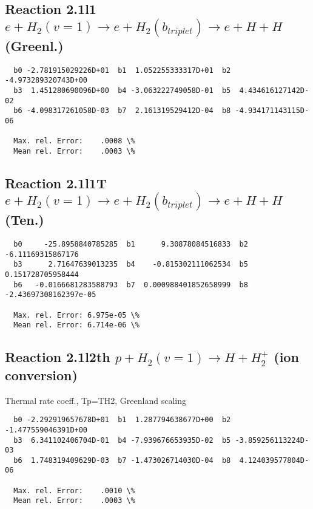 \documentclass[12pt,dvipdfmx]{article}
\begin{document}
\newpage
\subsection{
Reaction 2.1l1
$ e + H_2(v=1) \rightarrow e + H_2(b_{triplet})\rightarrow e + H + H $ (Greenl.)
}


\begin{small}\begin{verbatim}
  b0 -2.781915029226D+01  b1  1.052255333317D+01  b2 -4.973289320743D+00
  b3  1.451280690096D+00  b4 -3.063222749058D-01  b5  4.434616127142D-02
  b6 -4.098317261058D-03  b7  2.161319529412D-04  b8 -4.934171143115D-06

  Max. rel. Error:    .0008 \%
  Mean rel. Error:    .0003 \%

\end{verbatim}\end{small}


\subsection{
Reaction 2.1l1T
$ e +  H_2(v=1) \rightarrow e + H_2(b_{triplet})\rightarrow e + H + H $ (Ten.)
}

\begin{small}\begin{verbatim}
  b0     -25.8958840785285  b1      9.30878084516833  b2     -6.11169315867176
  b3      2.71647639013235  b4    -0.815302111062534  b5     0.151728705958444
  b6   -0.0166681283588793  b7  0.000988401852658999  b8 -2.43697308162397e-05

  Max. rel. Error: 6.975e-05 \%
  Mean rel. Error: 6.714e-06 \%
\end{verbatim}\end{small}




\subsection{
Reaction 2.1l2th
$ p + H_2(v=1) \rightarrow H + H_2^+$ (ion conversion)
}
Thermal rate coeff., Tp=TH2, Greenland scaling

\begin{small}\begin{verbatim}
  b0 -2.292919657678D+01  b1  1.287794638677D+00  b2 -1.477559046391D+00
  b3  6.341102406704D-01  b4 -7.939676653935D-02  b5 -3.859256113224D-03
  b6  1.748319409629D-03  b7 -1.473026714030D-04  b8  4.124039577804D-06

  Max. rel. Error:    .0010 \%
  Mean rel. Error:    .0003 \%
\end{verbatim}\end{small}
\end{document}
